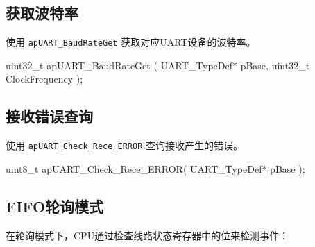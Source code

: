 \documentclass[
  12pt,
]{book}
\newenvironment{Shaded}{\begin{snugshade}}{\end{snugshade}}
\newcommand{\DataTypeTok}[1]{\textcolor[rgb]{0.13,0.29,0.53}{#1}}
\newcommand{\NormalTok}[1]{#1}
\begin{document}
\hypertarget{ux83b7ux53d6ux6ce2ux7279ux7387}{%
\subsection{获取波特率}\label{ux83b7ux53d6ux6ce2ux7279ux7387}}

使用 \texttt{apUART\_BaudRateGet} 获取对应UART设备的波特率。

\begin{Shaded}
\begin{Highlighting}[]
\DataTypeTok{uint32_t}\NormalTok{ apUART_BaudRateGet (}
\NormalTok{  UART_TypeDef* pBase, }
  \DataTypeTok{uint32_t}\NormalTok{ ClockFrequency}
\NormalTok{  );}
\end{Highlighting}
\end{Shaded}

\hypertarget{ux63a5ux6536ux9519ux8befux67e5ux8be2}{%
\subsection{接收错误查询}\label{ux63a5ux6536ux9519ux8befux67e5ux8be2}}

使用 \texttt{apUART\_Check\_Rece\_ERROR} 查询接收产生的错误。

\begin{Shaded}
\begin{Highlighting}[]
\DataTypeTok{uint8_t}\NormalTok{ apUART_Check_Rece_ERROR(}
\NormalTok{  UART_TypeDef* pBase}
\NormalTok{  );}
\end{Highlighting}
\end{Shaded}

\hypertarget{fifoux8f6eux8be2ux6a21ux5f0f}{%
\subsection{FIFO轮询模式}\label{fifoux8f6eux8be2ux6a21ux5f0f}}

在轮询模式下，CPU通过检查线路状态寄存器中的位来检测事件：
\end{document}
